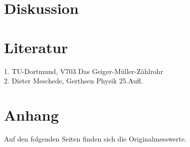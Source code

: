 \section{Diskussion}
\label{sec:diskussion}


\section{Literatur}
\label{sec:literatur}
1. TU-Dortmund, V703 Das Geiger-Müller-Zählrohr\\
2. Dieter Meschede, Gerthsen Physik 25.Aufl.

\section{Anhang}
\label{sec:anhang}
Auf den folgenden Seiten finden sich die Originalmesswerte.